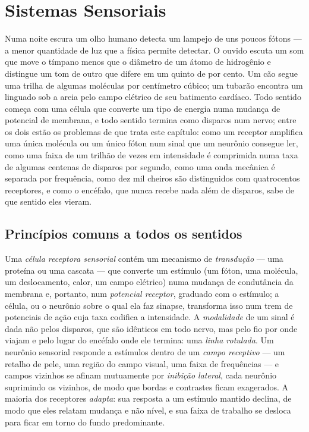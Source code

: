 \chapter{Sistemas Sensoriais}\label{ch:b3:sensory-systems}

Numa noite escura um olho humano detecta um lampejo de uns poucos
fótons --- a menor quantidade de luz que a física permite detectar. O
ouvido escuta um som que move o tímpano menos que o diâmetro de um
átomo de hidrogênio e distingue um tom de outro que difere em um quinto
de por cento. Um cão segue uma trilha de algumas moléculas por
centímetro cúbico; um tubarão encontra um linguado sob a areia pelo
campo elétrico de seu batimento cardíaco. Todo sentido começa com uma
célula que converte um tipo de energia numa mudança de potencial de
membrana, e todo sentido termina como disparos num nervo; entre os dois
estão os problemas de que trata este capítulo: como um receptor
amplifica uma única molécula ou um único fóton num sinal que um
neurônio consegue ler, como uma faixa de um trilhão de vezes em
intensidade é comprimida numa taxa de algumas centenas de disparos por
segundo, como uma onda mecânica é separada por frequência, como dez mil
cheiros são distinguidos com quatrocentos receptores, e como o encéfalo,
que nunca recebe nada além de disparos, sabe de que sentido eles vieram.

\section{Princípios comuns a todos os sentidos}

\begin{definition}\label{def:b3:sensory-systems:principles}
Uma \emph{célula receptora sensorial} contém um mecanismo de
\emph{transdução} --- uma proteína ou uma cascata --- que converte um
estímulo (um fóton, uma molécula, um deslocamento, calor, um campo
elétrico) numa mudança de condutância da membrana e, portanto, num
\emph{potencial receptor}, graduado com o estímulo; a célula, ou o
neurônio sobre o qual ela faz sinapse, transforma isso num trem de
potenciais de ação cuja taxa codifica a intensidade. A
\emph{modalidade} de um sinal é dada não pelos disparos, que são
idênticos em todo nervo, mas pelo fio por onde viajam e pelo lugar do
encéfalo onde ele termina: uma \emph{linha rotulada}. Um neurônio
sensorial responde a estímulos dentro de um \emph{campo receptivo} ---
um retalho de pele, uma região do campo visual, uma faixa de
frequências --- e campos vizinhos se afinam mutuamente por
\emph{inibição lateral}, cada neurônio suprimindo os vizinhos, de modo
que bordas e contrastes ficam exagerados. A maioria dos receptores
\emph{adapta}: sua resposta a um estímulo mantido declina, de modo que
eles relatam mudança e não nível, e sua faixa de trabalho se desloca
para ficar em torno do fundo predominante.
\end{definition}

